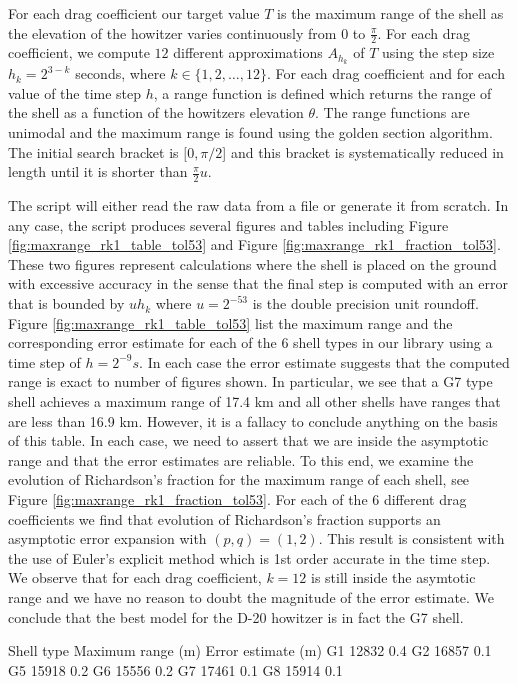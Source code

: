\documentclass[runningheads]{llncs}
\begin{document}
For each drag coefficient our target value $T$ is the maximum range of the shell as the elevation of the howitzer varies continuously from $0$ to $\frac{\pi}{2}$. For each drag coefficient, we compute $12$ different approximations $A_{h_k}$ of $T$ using the step size $h_k = 2^{3-k}$ seconds, where $k \in \{1,2,\dots,12\}$.
For each drag coefficient and for each value of the time step $h$, a range function is defined which returns the range of the shell as a function of the howitzers elevation $\theta$.
The range functions are unimodal and the maximum range is found using the golden section algorithm.
The initial search bracket is $[0,\pi/2$] and this bracket is systematically reduced in length until it is shorter than $\frac{\pi}{2}u$.

The script will either read the raw data from a file or generate it from scratch. In any case, the script produces several figures and tables including Figure \ref{fig:maxrange_rk1_table_tol53} and Figure \ref{fig:maxrange_rk1_fraction_tol53}. These two figures represent calculations where the shell is placed on the ground with excessive accuracy in the sense that the final step is computed with an error that is bounded by $u h_{k}$ where $u = 2^{-53}$ is the double precision unit roundoff. Figure \ref{fig:maxrange_rk1_table_tol53} list the maximum range and the corresponding error estimate for each of the 6 shell types in our library using a time step of $h = 2^{-9} s$. In each case the error estimate suggests that the computed range is exact to number of figures shown. In particular, we see that a G7 type shell achieves a maximum range of 17.4 km and all other shells have ranges that are less than 16.9 km. However, it is a fallacy to conclude anything on the basis of this table. In each case, we need to assert that we are inside the asymptotic range and that the error estimates are reliable. To this end, we examine the evolution of Richardson's fraction for the maximum range of each shell, see Figure \ref{fig:maxrange_rk1_fraction_tol53}. For each of the 6 different drag coefficients we find that evolution of Richardson's fraction supports an asymptotic error expansion with $(p,q) = (1,2)$. This result is consistent with the use of Euler's explicit method which is 1st order accurate in the time step. We observe that for each drag coefficient, $k=12$ is still inside the asymtotic range and we have no reason to doubt the magnitude of the error estimate. We conclude that the best model for the D-20 howitzer is in fact the G7 shell.

\begin{myverbbox}[\normalsize]{\vgamma}
Shell type  Maximum range (m) Error estimate (m)
    G1           12832                0.4 
    G2           16857                0.1 
    G5           15918                0.2 
    G6           15556                0.2 
    G7           17461                0.1 
    G8           15914                0.1 
\end{myverbbox}
\end{document}
